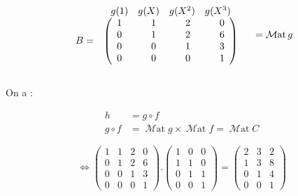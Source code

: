 \documentclass[a4paper,12pt]{article}
\DeclareMathOperator{\Mat}{\mathcal{M}at}
\begin{document}
\[
  \begin{array}{cccc}
    &\begin{array}{cccc} g(1)&g(X)&g(X^2)&g(X^3) \end{array} & \\
    B=&\left(\begin{array}{c@{\hspace*{3em}}c@{\hspace*{3em}}c@{\hspace*{3em}}c}
            1 & 1 & 2 & 0 \\
            0 & 1 & 2 & 6 \\
            0 & 0 & 1 & 3 \\
            0 & 0 & 0 & 1
          \end{array} \right)
  \end{array}
  = \Mat g
\]

\subsection{}

On a :

\begin{align*}
  h        & =g\circ f                                             \\
  g\circ f & =\Mat g \times \Mat f = \Mat C
\end{align*}

\[
  \Leftrightarrow
  \begin{pmatrix}
    1 & 1 & 2 & 0 \\
    0 & 1 & 2 & 6 \\
    0 & 0 & 1 & 3 \\
    0 & 0 & 0 & 1
  \end{pmatrix}
  .
  \begin{pmatrix}
    1 & 0 & 0 \\
    1 & 1 & 0 \\
    0 & 1 & 1 \\
    0 & 0 & 1
  \end{pmatrix}
  =
  \begin{pmatrix}
    2 & 3 & 2 \\
    1 & 3 & 8 \\
    0 & 1 & 4 \\
    0 & 0 & 1
  \end{pmatrix}
\]

\clearpage

\section{}
\end{document}
